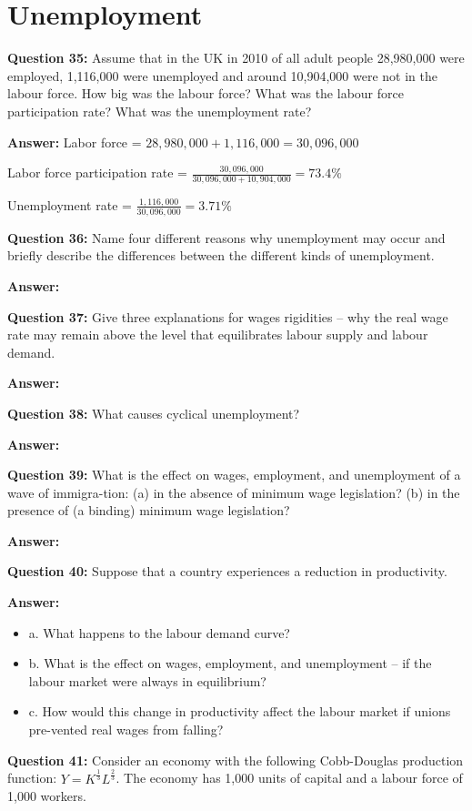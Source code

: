 \documentclass[a4paper, 11pt]{article}
\begin{document}
\section{Unemployment}
\textbf{Question 35:} Assume that in the UK in 2010 of all adult people 28,980,000 were employed, 1,116,000 were unemployed and around 10,904,000 were not in the labour force. How big was the labour force? What was the labour force participation rate? What was the unemployment rate?

\textbf{Answer:}
Labor force = $28,980,000 + 1,116,000 = 30,096,000$

Labor force participation rate = $\frac{30,096,000}{30,096,000 + 10,904,000} = 73.4\%$

Unemployment rate = $\frac{1,116,000}{30,096,000} = 3.71\%$ 

\textbf{Question 36:} Name four different reasons why unemployment may occur and briefly describe the differences between the different kinds of unemployment.

\textbf{Answer:}

\textbf{Question 37:} Give three explanations for wages rigidities – why the real wage rate may remain above the level that equilibrates labour supply and labour demand.

\textbf{Answer:}

\textbf{Question 38:} What causes cyclical unemployment? 

\textbf{Answer:}

\textbf{Question 39:} What is the effect on wages, employment, and unemployment of a wave of immigra-tion: (a) in the absence of minimum wage legislation? (b) in the presence of (a binding) minimum wage legislation?

\textbf{Answer:}

\textbf{Question 40:} Suppose that a country experiences a reduction in productivity.

\textbf{Answer:}

\begin{itemize}
\item a. What happens to the labour demand curve?
\item b. What is the effect on wages, employment, and unemployment – if the labour market were always in equilibrium?
\item c. How would this change in productivity affect the labour market if unions pre-vented real wages from falling?
\end{itemize}

\textbf{Question 41:} Consider an economy with the following Cobb-Douglas production function: $Y = K^{\frac{1}{3}}L^{\frac{2}{3}}$. The economy has 1,000 units of capital and a labour force of 1,000 workers.
\end{document}
